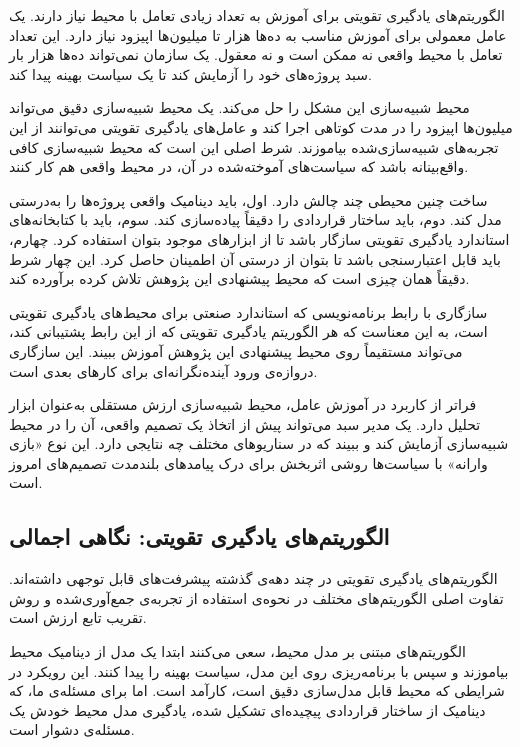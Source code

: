 الگوریتم‌های یادگیری تقویتی برای آموزش به تعداد زیادی تعامل با
محیط نیاز دارند. یک عامل معمولی برای آموزش مناسب به ده‌ها هزار
تا میلیون‌ها اپیزود نیاز دارد. این تعداد تعامل با محیط واقعی
نه ممکن است و نه معقول. یک سازمان نمی‌تواند ده‌ها هزار بار
سبد پروژه‌های خود را آزمایش کند تا یک سیاست بهینه پیدا کند.

محیط شبیه‌سازی این مشکل را حل می‌کند. یک محیط شبیه‌سازی دقیق
می‌تواند میلیون‌ها اپیزود را در مدت کوتاهی اجرا کند و
عامل‌های یادگیری تقویتی می‌توانند از این تجربه‌های شبیه‌سازی‌شده
بیاموزند. شرط اصلی این است که محیط شبیه‌سازی کافی واقع‌بینانه
باشد که سیاست‌های آموخته‌شده در آن، در محیط واقعی هم کار کنند.

ساخت چنین محیطی چند چالش دارد. اول، باید دینامیک واقعی پروژه‌ها
را به‌درستی مدل کند. دوم، باید ساختار قراردادی را دقیقاً پیاده‌سازی
کند. سوم، باید با کتابخانه‌های استاندارد یادگیری تقویتی سازگار باشد
تا از ابزارهای موجود بتوان استفاده کرد. چهارم، باید قابل اعتبارسنجی
باشد تا بتوان از درستی آن اطمینان حاصل کرد. این چهار شرط دقیقاً
همان چیزی است که محیط پیشنهادی این پژوهش تلاش کرده برآورده کند.

سازگاری با رابط برنامه‌نویسی  که استاندارد
صنعتی برای محیط‌های یادگیری تقویتی است، به این معناست که
هر الگوریتم یادگیری تقویتی که از این رابط پشتیبانی کند،
می‌تواند مستقیماً روی محیط پیشنهادی این پژوهش آموزش ببیند.
این سازگاری دروازه‌ی ورود آینده‌نگرانه‌ای برای کارهای بعدی است.

فراتر از کاربرد در آموزش عامل، محیط شبیه‌سازی ارزش مستقلی
به‌عنوان ابزار تحلیل دارد. یک مدیر سبد می‌تواند پیش از اتخاذ
یک تصمیم واقعی، آن را در محیط شبیه‌سازی آزمایش کند و ببیند
که در سناریوهای مختلف چه نتایجی دارد. این نوع «بازی وارانه»
با سیاست‌ها روشی اثربخش برای درک پیامدهای بلندمدت تصمیم‌های
امروز است.

\subsection{الگوریتم‌های یادگیری تقویتی: نگاهی اجمالی}
\label{subsec:rl_algorithms}

الگوریتم‌های یادگیری تقویتی در چند دهه‌ی گذشته پیشرفت‌های
قابل توجهی داشته‌اند. تفاوت اصلی الگوریتم‌های مختلف در نحوه‌ی
استفاده از تجربه‌ی جمع‌آوری‌شده و روش تقریب تابع ارزش است.

الگوریتم‌های مبتنی بر مدل محیط، سعی می‌کنند ابتدا یک مدل
از دینامیک محیط بیاموزند و سپس با برنامه‌ریزی روی این مدل،
سیاست بهینه را پیدا کنند. این رویکرد در شرایطی که محیط
قابل مدل‌سازی دقیق است، کارآمد است. اما برای مسئله‌ی ما،
که دینامیک از ساختار قراردادی پیچیده‌ای تشکیل شده، یادگیری
مدل محیط خودش یک مسئله‌ی دشوار است.

